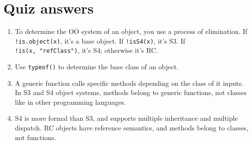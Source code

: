 \hypertarget{oo-answers}{%
\section{Quiz answers}\label{oo-answers}}

\begin{enumerate}
\def\labelenumi{\arabic{enumi}.}
\item
  To determine the OO system of an object, you use a process of
  elimination. If \texttt{!is.object(x)}, it's a base object. If
  \texttt{!isS4(x)}, it's S3. If \texttt{!is(x,\ "refClass")}, it's S4;
  otherwise it's RC.
\item
  Use \texttt{typeof()} to determine the base class of an object.
\item
  A generic function calls specific methods depending on the class of it
  inputs. In S3 and S4 object systems, methods belong to generic
  functions, not classes like in other programming languages.
\item
  S4 is more formal than S3, and supports multiple inheritance and
  multiple dispatch. RC objects have reference semantics, and methods
  belong to classes, not functions.
\end{enumerate}
